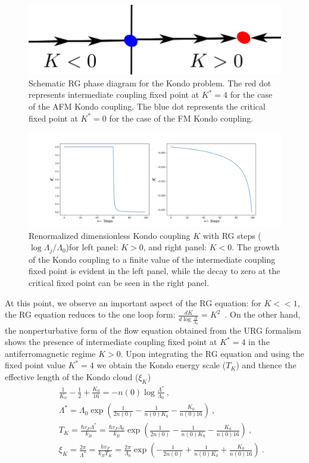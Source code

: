 \documentclass[aps,prl,preprint,groupedaddress]{revtex4-2}
\begin{document}
\begin{figure}[h!]
\centering
\includegraphics[scale=0.6]{Kondo.png}
\caption{Schematic RG phase diagram for the Kondo problem. The red dot represents intermediate coupling fixed point at $K^{*}=4$ for the case of the AFM Kondo coupling. The blue dot represents the critical fixed point at $K^{*}=0$ for the case of the FM Kondo coupling.} 
\end{figure}
\begin{figure}
\centering
\includegraphics[width=\textwidth]{RG_Flow.png}
\caption{Renormalized dimensionless Kondo coupling $K$ with RG steps ($\log\Lambda_{j}/\Lambda_{0}$)for left panel: $K>0$, and right panel: $K<0$. The growth of the Kondo coupling to a finite value of the intermediate coupling fixed point is evident in the left panel, while the decay to zero at the critical fixed point can be seen in the right panel.} \label{Kondocoupling}
\end{figure}
At this point, we observe an important aspect of the RG equation: for $K<<1$, the RG equation reduces to the one loop form: $\frac{d K}{d\log\frac{\Lambda}{\Lambda_{0}}}=K^{2}$~\cite{anderson1970poor}. On the other hand, the nonperturbative form of the flow equation obtained from the URG formalism shows the presence of intermediate coupling fixed point at $K^{*}=4$ in the antiferromagnetic regime $K>0$. Upon integrating the RG equation and using the fixed point value $K^{*}=4$ we obtain the Kondo energy scale ($T_{K}$) and thence the effective length of the Kondo cloud ($\xi_{K}$)
\begin{eqnarray}
&&\frac{1}{K_{0}}-\frac{1}{2}+\frac{K_{0}}{16}=-n(0)\log\frac{\Lambda^{*}}{\Lambda_{0}}~,\nonumber\\
&&\Lambda^{*}=\Lambda_{0}\exp\left(\frac{1}{2n(0)}-\frac{1}{n(0)K_{0}}-\frac{K_{0}}{n(0)16}\right)~,\label{gap function}\nonumber\\
&&T_{K} = \frac{\hbar v_{F}\Lambda^{*}}{k_{B}}= \frac{\hbar v_{F}\Lambda_{0}}{k_{B}}\exp\left(\frac{1}{2n(0)}-\frac{1}{n(0)K_{0}}-\frac{K_{0}}{n(0)16}\right)~,\label{KondoTemp}\nonumber\\
&&\xi_{K} = \frac{2\pi}{\Lambda^{*}} = \frac{h v_{F}}{k_{B}T_{K}} = \frac{2\pi}{\Lambda_{0}}\exp\left(-\frac{1}{2n(0)}+\frac{1}{n(0)K_{0}}+\frac{K_{0}}{n(0)16}\right)~.\label{KSlength}
\end{eqnarray}
\end{document}
